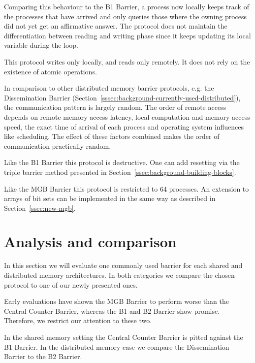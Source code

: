 \documentclass[a4paper, 10pt]{article}
\begin{document}
Comparing this behaviour to the B1 Barrier, a process now locally keeps track of the processes that have arrived and only queries those where the owning process did not yet get an affirmative answer.
The protocol does not maintain the differentiation between reading and writing phase since it keeps updating its local variable during the loop.

This protocol writes only locally, and reads only remotely. It does not rely on the existence of atomic operations.

In comparison to other distributed memory barrier protocols, e.g. the Dissemination Barrier (Section~\ref{sssec:background-currently-used-distributed}), the communication pattern is largely random. The order of remote access depends on remote memory access latency, local computation and memory access speed, the exact time of arrival of each process and operating system influences like scheduling. The effect of these factors combined makes the order of communication practically random.

Like the B1 Barrier this protocol is destructive. One can add resetting via the triple barrier method presented in Section~\ref{ssec:background-building-blocks}.

Like the MGB Barrier this protocol is restricted to 64 processes. An extension to arrays of bit sets can be implemented in the same way as described in Section~\ref{ssec:new-mgb}.

\section{Analysis and comparison}
\label{sec:analysis}

In this section we will evaluate one commonly used barrier for each shared and distributed memory architectures. In both categories we compare the chosen protocol to one of our newly presented ones.

Early evaluations have shown the MGB Barrier to perform worse than the Central Counter Barrier, whereas the B1 and B2 Barrier show promise. Therefore, we restrict our attention to these two.

In the shared memory setting the Central Counter Barrier is pitted against the B1 Barrier. In the distributed memory case we compare the Dissemination Barrier to the B2 Barrier.
\end{document}
